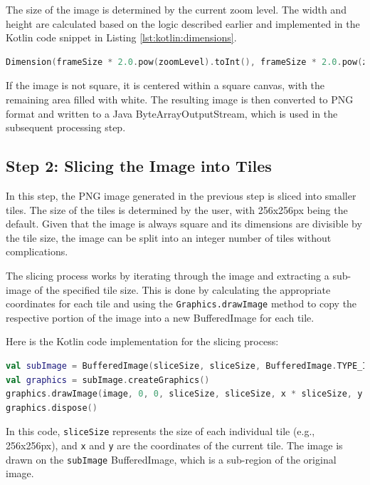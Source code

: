 The size of the image is determined by the current zoom level. The width and height are calculated based on the logic described earlier and implemented in the Kotlin code snippet in Listing \ref{lst:kotlin:dimensions}.

\begin{lstlisting}[language=Kotlin,caption=Image dimensions calculation,label=lst:kotlin:dimensions] 
Dimension(frameSize * 2.0.pow(zoomLevel).toInt(), frameSize * 2.0.pow(zoomLevel).toInt()) 
\end{lstlisting}

If the image is not square, it is centered within a square canvas, with the remaining area filled with white. The resulting image is then converted to PNG format and written to a Java ByteArrayOutputStream, which is used in the subsequent processing step.

\subsection{Step 2: Slicing the Image into Tiles}

In this step, the PNG image generated in the previous step is sliced into smaller tiles. The size of the tiles is determined by the user, with 256x256px being the default. Given that the image is always square and its dimensions are divisible by the tile size, the image can be split into an integer number of tiles without complications. 

The slicing process works by iterating through the image and extracting a sub-image of the specified tile size. This is done by calculating the appropriate coordinates for each tile and using the \texttt{Graphics.drawImage} method to copy the respective portion of the image into a new BufferedImage for each tile.

Here is the Kotlin code implementation for the slicing process:

\begin{lstlisting}[language=Kotlin,caption=Image Slicing Implementation,label=lst:kotlin:slicing]
val subImage = BufferedImage(sliceSize, sliceSize, BufferedImage.TYPE_INT_ARGB)
val graphics = subImage.createGraphics()
graphics.drawImage(image, 0, 0, sliceSize, sliceSize, x * sliceSize, y * sliceSize, (x + 1) * sliceSize, (y + 1) * sliceSize, null)
graphics.dispose()

\end{lstlisting}

In this code, \texttt{sliceSize} represents the size of each individual tile (e.g., 256x256px), and \texttt{x} and \texttt{y} are the coordinates of the current tile. The image is drawn on the \texttt{subImage} BufferedImage, which is a sub-region of the original image.


